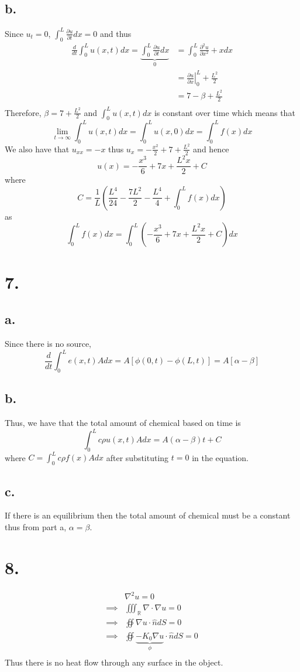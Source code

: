 \documentclass[11pt]{article}
\theoremstyle{mystyle}
\theoremstyle{definition}
\begin{document}
\subsection*{b.}
Since $u_t = 0$, $\int_0^L \displaystyle\frac{\partial u}{\partial t} dx = 0$ and thus 
\begin{align*}
  \frac{d}{dt} \int_0^L u(x,t) dx = \underbrace{\int_0^L \frac{\partial u}{\partial t} dx}
  _{0}
  &= \int_0^L \frac{\partial^2 u}{\partial x^2} + x dx \\
  &= \left. \frac{\partial u}{\partial x} \right|_0^L + \frac{L^2}{2} \\
  &= 7 - \beta + \frac{L^2}{2} \\  
\end{align*}
Therefore, $\beta = 7 + \frac{L^2}{2}$ and $\int_0^L u(x,t) dx$ is constant over time which means that  
\[
  \lim_{t \to \infty} \int_0^L u(x,t) dx = \int_0^L u(x,0) dx = \int_0^L f(x) dx  
\]
We also have that $u_{xx} = -x$ thus $u_x = -\frac{x^2}{2} + 7 + \frac{L^2}{2}$ and hence
\[
  u(x) = -\frac{x^3}{6} + 7x + \frac{L^2x}{2} + C
\]
where
\[    
  C = \frac{1}{L} \left(\frac{L^4}{24} - \frac{7L^2}{2} - \frac{L^4}{4} + \int_0^L f(x)dx \right) 
\]
as
\[
  \int_0^L f(x) dx = \int_0^L \left(-\frac{x^3}{6} + 7x + \frac{L^2x}{2} + C\right) dx
\]
\newpage
\section*{7.}
\subsection*{a.}
Since there is no source, 
\[
  \displaystyle\frac{d}{dt} \int_0^L e(x,t) A dx = A [\phi(0, t) - \phi(L, t)] = A[\alpha - \beta]
\]
\subsection*{b.}
Thus, we have that the total amount of chemical based on time is 
\[
  \int_0^L c \rho u(x,t) A dx = A(\alpha - \beta) t + C
\]
where $C = \int_0^L c\rho f(x) A dx$ after substituting $t = 0$ in the equation. 
\subsection*{c.}
If there is an equilibrium then the total amount of chemical must be a constant thus from part a, $\alpha = \beta$. 
\newpage
\section*{8.}
\begin{align*}
  & \nabla^2 u = 0 \\
  \implies & \iiint_\mathbb{R} \nabla \cdot \nabla u = 0 \\
  \implies & \oiint \nabla u \cdot \hat{n} dS = 0\\
  \implies & \oiint \underbrace{-K_0 \nabla u}_{\phi} \cdot \hat{n} dS = 0\\
\end{align*}
Thus there is no heat flow through any surface in the object. 
\newpage
\end{document}
